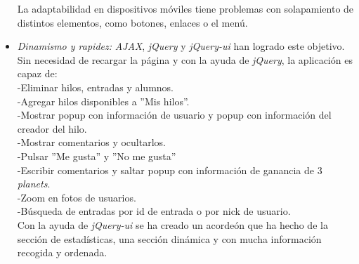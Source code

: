 \documentclass[a4paper, 12pt]{book}
\begin{document}
\begin{itemize}
  La adaptabilidad en dispositivos m\'oviles tiene problemas con solapamiento de distintos elementos, como botones, enlaces o el men\'u.
  \item \textit {Dinamismo y rapidez:} \textit{AJAX}, \textit{jQuery} y \textit{jQuery-ui} han logrado este objetivo. Sin necesidad de recargar la p\'agina y con la ayuda 
  de \textit{jQuery}, la aplicaci\'on es capaz de:\\
  -Eliminar hilos, entradas y alumnos.\\
  -Agregar hilos disponibles a ''Mis hilos''.\\
  -Mostrar popup con informaci\'on de usuario y popup con informaci\'on del creador del hilo.\\
  -Mostrar comentarios y ocultarlos.\\
  -Pulsar ''Me gusta'' y ''No me gusta''\\
  -Escribir comentarios y saltar popup con informaci\'on de ganancia de 3 \textit{planets}.\\
  -Zoom en fotos de usuarios.\\
  -B\'usqueda de entradas por id de entrada o por nick de usuario.\\
  Con la ayuda de \textit{jQuery-ui} se ha creado un acorde\'on que ha hecho de la secci\'on de estad\'isticas, una secci\'on din\'amica y con mucha informaci\'on recogida y 
  ordenada.
\end{itemize}
\end{document}
